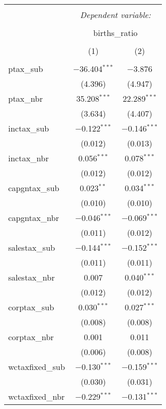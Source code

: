 
\begin{table}[!htbp] \centering 
  \caption{} 
  \label{} 
\begin{tabular}{@{\extracolsep{5pt}}lcc} 
\\[-1.8ex]\hline 
\hline \\[-1.8ex] 
 & \multicolumn{2}{c}{\textit{Dependent variable:}} \\ 
\cline{2-3} 
\\[-1.8ex] & \multicolumn{2}{c}{births\_ratio} \\ 
\\[-1.8ex] & (1) & (2)\\ 
\hline \\[-1.8ex] 
 ptax\_sub & $-$36.404$^{***}$ & $-$3.876 \\ 
  & (4.396) & (4.947) \\ 
  ptax\_nbr & 35.208$^{***}$ & 22.289$^{***}$ \\ 
  & (3.634) & (4.407) \\ 
  inctax\_sub & $-$0.122$^{***}$ & $-$0.146$^{***}$ \\ 
  & (0.012) & (0.013) \\ 
  inctax\_nbr & 0.056$^{***}$ & 0.078$^{***}$ \\ 
  & (0.012) & (0.012) \\ 
  capgntax\_sub & 0.023$^{**}$ & 0.034$^{***}$ \\ 
  & (0.010) & (0.010) \\ 
  capgntax\_nbr & $-$0.046$^{***}$ & $-$0.069$^{***}$ \\ 
  & (0.011) & (0.012) \\ 
  salestax\_sub & $-$0.144$^{***}$ & $-$0.152$^{***}$ \\ 
  & (0.011) & (0.011) \\ 
  salestax\_nbr & 0.007 & 0.040$^{***}$ \\ 
  & (0.012) & (0.012) \\ 
  corptax\_sub & 0.030$^{***}$ & 0.027$^{***}$ \\ 
  & (0.008) & (0.008) \\ 
  corptax\_nbr & 0.001 & 0.011 \\ 
  & (0.006) & (0.008) \\ 
  wctaxfixed\_sub & $-$0.130$^{***}$ & $-$0.159$^{***}$ \\ 
  & (0.030) & (0.031) \\ 
  wctaxfixed\_nbr & $-$0.229$^{***}$ & $-$0.131$^{***}$ \\ 

\end{tabular}
\end{table}
